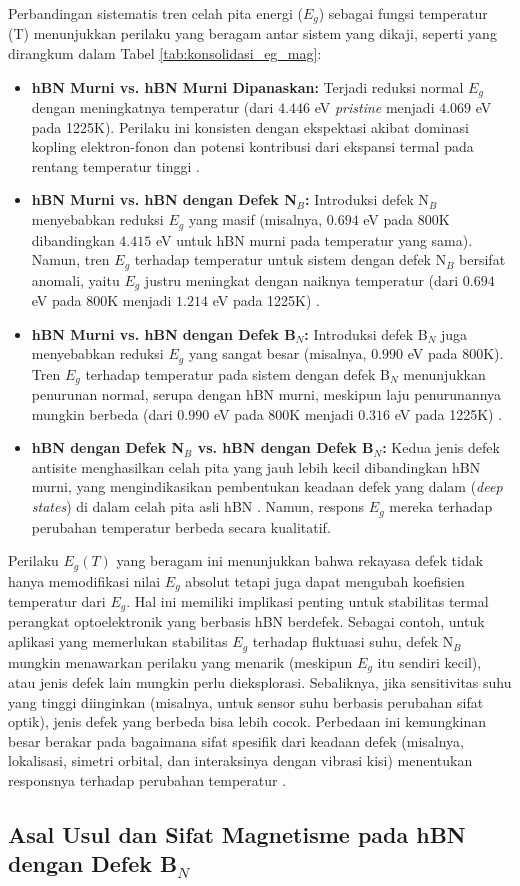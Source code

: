 \label{subsec:perbandingan_eg}
Perbandingan sistematis tren celah pita energi ($E_g$) sebagai fungsi temperatur (T) menunjukkan perilaku yang beragam antar sistem yang dikaji, seperti yang dirangkum dalam Tabel \ref{tab:konsolidasi_eg_mag}:
\begin{itemize}
    \item \textbf{hBN Murni vs. hBN Murni Dipanaskan:} Terjadi reduksi normal $E_g$ dengan meningkatnya temperatur (dari $4.446$ eV \textit{pristine} menjadi $4.069$ eV pada 1225K). Perilaku ini konsisten dengan ekspektasi akibat dominasi kopling elektron-fonon dan potensi kontribusi dari ekspansi termal pada rentang temperatur tinggi . \item \textbf{hBN Murni vs. hBN dengan Defek N$_B$:} Introduksi defek N$_B$ menyebabkan reduksi $E_g$ yang masif (misalnya, $0.694$ eV pada 800K dibandingkan $4.415$ eV untuk hBN murni pada temperatur yang sama). Namun, tren $E_g$ terhadap temperatur untuk sistem dengan defek N$_B$ bersifat anomali, yaitu $E_g$ justru meningkat dengan naiknya temperatur (dari $0.694$ eV pada 800K menjadi $1.214$ eV pada 1225K) . \item \textbf{hBN Murni vs. hBN dengan Defek B$_N$:} Introduksi defek B$_N$ juga menyebabkan reduksi $E_g$ yang sangat besar (misalnya, $0.990$ eV pada 800K). Tren $E_g$ terhadap temperatur pada sistem dengan defek B$_N$ menunjukkan penurunan normal, serupa dengan hBN murni, meskipun laju penurunannya mungkin berbeda (dari $0.990$ eV pada 800K menjadi $0.316$ eV pada 1225K) . \item \textbf{hBN dengan Defek N$_B$ vs. hBN dengan Defek B$_N$:} Kedua jenis defek antisite menghasilkan celah pita yang jauh lebih kecil dibandingkan hBN murni, yang mengindikasikan pembentukan keadaan defek yang dalam (\textit{deep states}) di dalam celah pita asli hBN \citep{Freysoldt2014}. Namun, respons $E_g$ mereka terhadap perubahan temperatur berbeda secara kualitatif. \end{itemize}
Perilaku $E_g(T)$ yang beragam ini menunjukkan bahwa rekayasa defek tidak hanya memodifikasi nilai $E_g$ absolut tetapi juga dapat mengubah koefisien temperatur dari $E_g$. Hal ini memiliki implikasi penting untuk stabilitas termal perangkat optoelektronik yang berbasis hBN berdefek. Sebagai contoh, untuk aplikasi yang memerlukan stabilitas $E_g$ terhadap fluktuasi suhu, defek N$_B$ mungkin menawarkan perilaku yang menarik (meskipun $E_g$ itu sendiri kecil), atau jenis defek lain mungkin perlu dieksplorasi. Sebaliknya, jika sensitivitas suhu yang tinggi diinginkan (misalnya, untuk sensor suhu berbasis perubahan sifat optik), jenis defek yang berbeda bisa lebih cocok. Perbedaan ini kemungkinan besar berakar pada bagaimana sifat spesifik dari keadaan defek (misalnya, lokalisasi, simetri orbital, dan interaksinya dengan vibrasi kisi) menentukan responsnya terhadap perubahan temperatur . \subsection{Asal Usul dan Sifat Magnetisme pada hBN dengan Defek B$_N$}
